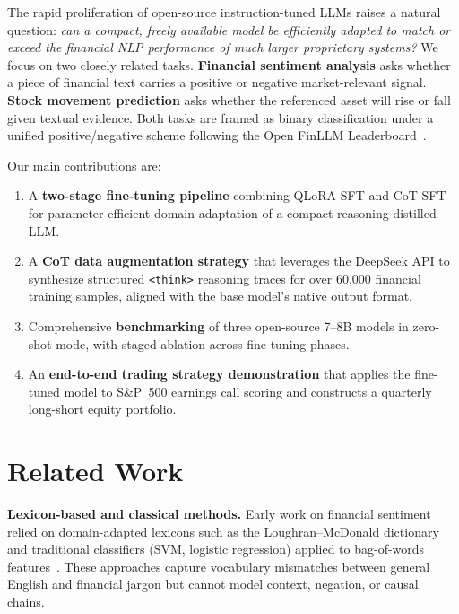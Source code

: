 \documentclass[11pt,letterpaper]{article}
\begin{document}
The rapid proliferation of open-source instruction-tuned LLMs raises a
natural question: \emph{can a compact, freely available model be
efficiently adapted to match or exceed the financial NLP performance of
much larger proprietary systems?}
We focus on two closely related tasks.
\textbf{Financial sentiment analysis} asks whether a piece of financial
text carries a positive or negative market-relevant signal.
\textbf{Stock movement prediction} asks whether the referenced asset will
rise or fall given textual evidence.
Both tasks are framed as binary classification under a unified
positive/negative scheme following the Open FinLLM
Leaderboard~\cite{huang2024openfinllms}.

Our main contributions are:
\begin{enumerate}[itemsep=1pt]
  \item A \textbf{two-stage fine-tuning pipeline} combining QLoRA-SFT
        and CoT-SFT for parameter-efficient domain adaptation of a
        compact reasoning-distilled LLM.
  \item A \textbf{CoT data augmentation strategy} that leverages the
        DeepSeek API to synthesize structured \texttt{<think>} reasoning
        traces for over 60,000 financial training samples, aligned with
        the base model's native output format.
  \item Comprehensive \textbf{benchmarking} of three open-source 7--8B
        models in zero-shot mode, with staged ablation across fine-tuning
        phases.
  \item An \textbf{end-to-end trading strategy demonstration} that
        applies the fine-tuned model to S\&P~500 earnings call scoring
        and constructs a quarterly long-short equity portfolio.
\end{enumerate}

\section{Related Work}
\label{sec:related}

\textbf{Lexicon-based and classical methods.}
Early work on financial sentiment relied on domain-adapted lexicons such
as the Loughran--McDonald dictionary~\cite{loughran2011liability} and
traditional classifiers (SVM, logistic regression) applied to bag-of-words
features~\cite{cam2024twitter}.
These approaches capture vocabulary mismatches between general English and
financial jargon but cannot model context, negation, or causal chains.
\end{document}
